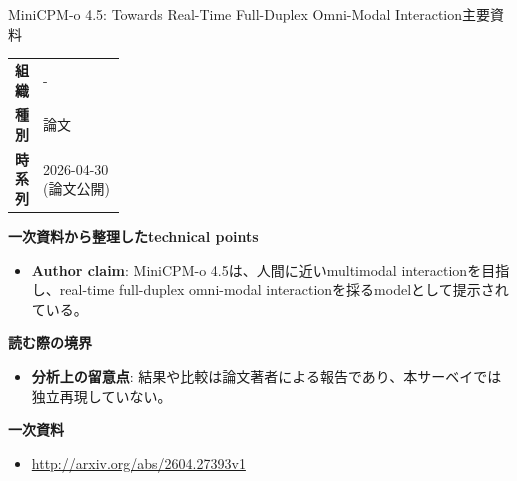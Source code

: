\begin{technicalnote}{MiniCPM-o 4.5: Towards Real-Time Full-Duplex Omni-Modal Interaction}{主要資料}
\begingroup
\begin{tabularx}{\linewidth}{@{}>{\bfseries}p{0.22\linewidth}X@{}}
組織 & - \\
種別 & 論文 \\
時系列 & 2026-04-30 (論文公開) \\
\end{tabularx}
\smallskip
{\bfseries 一次資料から整理したtechnical points}
\begin{itemize}[leftmargin=1.5em,itemsep=0.35em]
\item \textbf{Author claim}: MiniCPM-o 4.5は、人間に近いmultimodal interactionを目指し、real-time full-duplex omni-modal interactionを採るmodelとして提示されている。
\end{itemize}
{\bfseries 読む際の境界}
\begin{itemize}[leftmargin=1.5em,itemsep=0.35em]
\item \textbf{分析上の留意点}: 結果や比較は論文著者による報告であり、本サーベイでは独立再現していない。
\end{itemize}
\begin{samepage}
{\bfseries 一次資料}
\begingroup\sloppy
\begin{itemize}[leftmargin=1.5em,itemsep=0.25em]
\item {\scriptsize\url{http://arxiv.org/abs/2604.27393v1}}
\end{itemize}
\endgroup
\end{samepage}
\endgroup
\end{technicalnote}
\medskip

